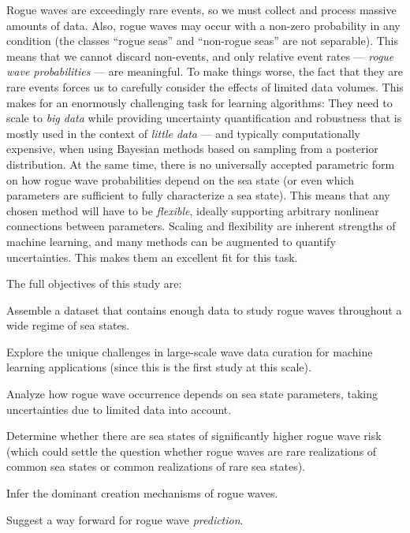 %
Rogue waves are exceedingly rare events, so we must collect and process massive amounts of data. Also, rogue waves may occur with a non-zero probability in any condition (\ie the classes \enquote{rogue seas} and \enquote{non-rogue seas} are not separable). This means that we cannot discard non-events, and only relative event rates --- \emph{rogue wave probabilities} --- are meaningful. To make things worse, the fact that they are rare events forces us to carefully consider the effects of limited data volumes. This makes for an enormously challenging task for learning algorithms: They need to scale to \emph{big data} while providing uncertainty quantification and robustness that is mostly used in the context of \emph{little data} --- and typically computationally expensive, \eg when using Bayesian methods based on sampling from a posterior distribution. At the same time, there is no universally accepted parametric form on how rogue wave probabilities depend on the sea state (or even which parameters are sufficient to fully characterize a sea state). This means that any chosen method will have to be \emph{flexible}, ideally supporting arbitrary nonlinear connections between parameters. Scaling and flexibility are inherent strengths of machine learning, and many methods can be augmented to quantify uncertainties. This makes them an excellent fit for this task.

\clearpage
The full objectives of this study are:

\begin{renum}
    \item Assemble a dataset that contains enough data to study rogue waves throughout a wide regime of sea states.
    \item Explore the unique challenges in large-scale wave data curation for machine learning applications (since this is the first study at this scale).
    \item Analyze how rogue wave occurrence depends on sea state parameters, taking uncertainties due to limited data into account.
    \item Determine whether there are sea states of significantly higher rogue wave risk (which could settle the question whether rogue waves are rare realizations of common sea states or common realizations of rare sea states).
    \item Infer the dominant creation mechanisms of rogue waves.
    \item Suggest a way forward for rogue wave \emph{prediction}.
\end{renum}


